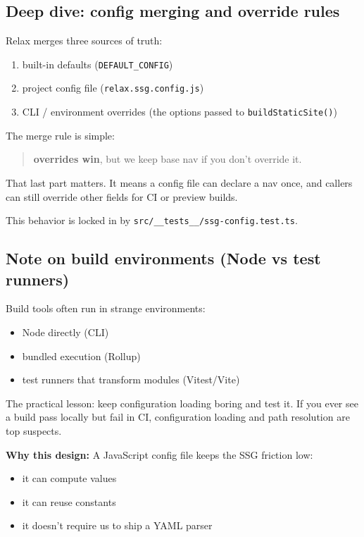 \subsection{Deep dive: config merging and override rules}
Relax merges three sources of truth:

\begin{enumerate}
  \item built-in defaults (\texttt{DEFAULT\_CONFIG})
  \item project config file (\texttt{relax.ssg.config.js})
  \item CLI / environment overrides (the options passed to \texttt{buildStaticSite()})
\end{enumerate}

The merge rule is simple:

\begin{quote}
	\textbf{overrides win}, but we keep base nav if you don't override it.
\end{quote}

That last part matters.
It means a config file can declare a nav once, and callers can still override other fields for CI or preview builds.

This behavior is locked in by \texttt{src/\_\_tests\_\_/ssg-config.test.ts}.

\subsection{Note on build environments (Node vs test runners)}
Build tools often run in strange environments:

\begin{itemize}
  \item Node directly (CLI)
  \item bundled execution (Rollup)
  \item test runners that transform modules (Vitest/Vite)
\end{itemize}

The practical lesson: keep configuration loading boring and test it.
If you ever see a build pass locally but fail in CI, configuration loading and path resolution are top suspects.

\textbf{Why this design:}
A JavaScript config file keeps the SSG friction low:

\begin{itemize}
  \item it can compute values
  \item it can reuse constants
  \item it doesn't require us to ship a YAML parser
\end{itemize}

